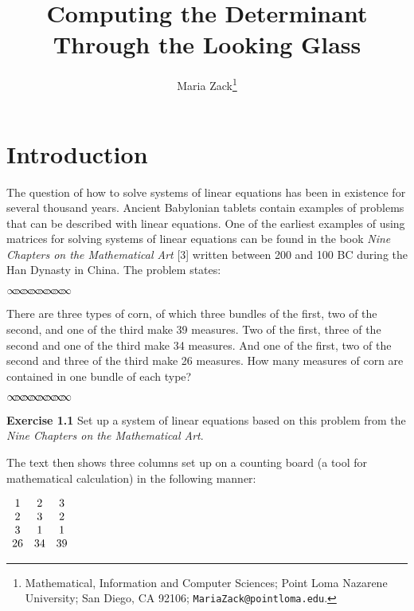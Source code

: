 \documentclass[11pt]{article}%
\theoremstyle{definition}
\newcommand{\sep}{\vspace{-3pt} \begin{center}
{\mathversion{normal}
$\infty \mspace{-5.5mu} \infty \mspace{-5.5mu}
\infty \mspace{-5.5mu} \infty \mspace{-5.5mu}
\infty \mspace{-5.5mu} \infty \mspace{-5.5mu}
\infty \mspace{-5.5mu} \infty$}
\end{center} \vspace{-3pt}}
\begin{document}
\title{Computing the Determinant Through the Looking Glass}
\author{Maria Zack\thanks{Mathematical, Information and Computer Sciences; Point Loma
Nazarene University; San Diego, CA 92106; \texttt{MariaZack@pointloma.edu}.}}
\date{}
\maketitle

\section{\bigskip\vspace{0in}\vspace{-0.1in}Introduction}

The question of how to solve systems of linear equations has been in existence
for several thousand years. Ancient Babylonian tablets contain examples of
problems that can be described with linear equations. One of the earliest
examples of using matrices for solving systems of linear equations can be
found in the book \textit{Nine Chapters on the Mathematical Art} [3] written
between 200 and 100 BC during the Han Dynasty in China. The problem states:%

\sep


\textsf{There are three types of corn, of which three bundles of the first,
two of the second, and one of the third make 39 measures. Two of the first,
three of the second and one of the third make 34 measures. And one of the
first, two of the second and three of the third make 26 measures. How many
measures of corn are contained in one bundle of each type?}%

\sep


\noindent\textbf{Exercise 1.1} Set up a system of linear equations based on
this problem from the \textit{Nine Chapters on the Mathematical Art}.

\bigskip

The text then shows three columns set up on a counting board (a tool for
mathematical calculation) in the following manner:

\begin{center}
$%
\begin{array}
[c]{ccc}%
1 & 2 & 3\\
2 & 3 & 2\\
3 & 1 & 1\\
26 & 34 & 39
\end{array}
$
\end{center}
\end{document}
